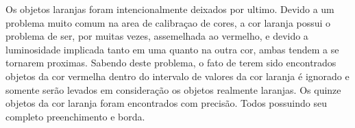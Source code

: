 	Os objetos laranjas foram intencionalmente deixados por ultimo.
	Devido a um problema muito comum na area de calibraçao de cores, a cor laranja possui o problema de ser, por muitas vezes, assemelhada ao vermelho, e devido a luminosidade implicada tanto em uma quanto na outra cor, ambas tendem a se tornarem proximas.
	Sabendo deste problema, o fato de terem sido encontrados objetos da cor vermelha dentro do intervalo de valores da cor laranja é ignorado e somente serão levados em consideração os objetos realmente laranjas.
	Os quinze objetos da cor laranja foram encontrados com precisão. Todos possuindo seu completo preenchimento e borda.
%
%
%
%
